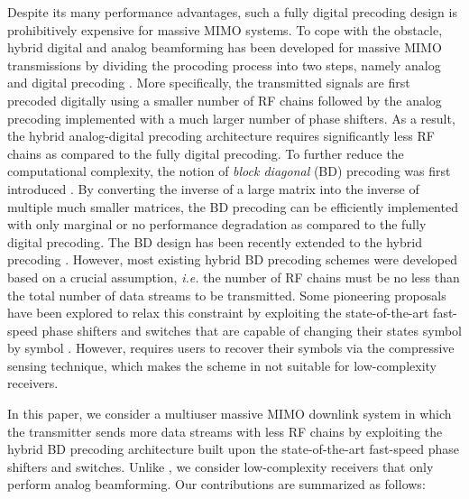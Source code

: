 \documentclass[conference]{IEEEtran}
\begin{document}
Despite its many performance advantages, such a fully digital precoding design is prohibitively expensive for massive MIMO systems. To cope with the obstacle, hybrid digital and analog beamforming has been developed for massive MIMO transmissions by dividing the procoding process into two steps, namely analog and digital precoding \cite{alkhateeb2014channel}. More specifically, the transmitted signals are first precoded digitally using a smaller number of RF chains followed by the analog precoding implemented with a much larger number of phase shifters. As a result, the hybrid analog-digital precoding architecture requires significantly less RF chains as compared to the fully digital precoding. To further reduce the computational complexity, the notion of \textit{block diagonal} (BD) precoding was first introduced \cite{spencer2004zero}. By converting the inverse of a large matrix into the inverse of  multiple much smaller matrices, the BD precoding can be efficiently implemented with only marginal or no performance degradation as compared to the fully digital precoding\cite{spencer2004zero}. The BD design has been recently extended to the hybrid precoding \cite{liu2014phase}. However, most existing hybrid BD precoding schemes were developed based on a crucial assumption, {\em i.e.} the number of RF chains must be no less than the total number of data streams to be transmitted. Some pioneering proposals have been explored to relax this constraint by exploiting the state-of-the-art fast-speed phase shifters and switches that are capable of changing their states symbol by symbol \cite{garcia2017mimo}. However, \cite{garcia2017mimo} requires users to recover their symbols via the compressive sensing technique, which makes the scheme in \cite{garcia2017mimo} not suitable for low-complexity receivers.

In this paper, we consider a multiuser massive MIMO downlink system in which the transmitter sends more data streams with less RF chains by exploiting the hybrid BD precoding architecture built upon the state-of-the-art fast-speed phase shifters and switches. Unlike \cite{garcia2017mimo}, we consider low-complexity receivers that only perform analog beamforming. Our contributions are summarized as follows:
\end{document}
